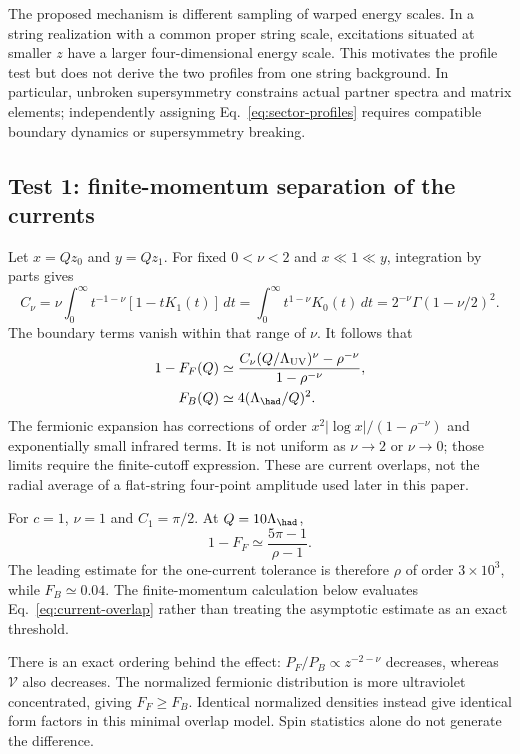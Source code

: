 The proposed mechanism is different sampling of warped energy scales. In a string realization with a common proper string scale, excitations situated at smaller $z$ have a larger four-dimensional energy scale. This motivates the profile test but does not derive the two profiles from one string background. In particular, unbroken supersymmetry constrains actual partner spectra and matrix elements; independently assigning Eq.~\eqref{eq:sector-profiles} requires compatible boundary dynamics or supersymmetry breaking.

\subsection{Test 1: finite-momentum separation of the currents}
Let $x=Qz_0$ and $y=Qz_1$. For fixed $0<\nu<2$ and $x\ll1\ll y$, integration by parts gives
\begin{equation}
 C_\nu=\nu\int_0^\infty t^{-1-\nu}[1-tK_1(t)]\,dt
 =\int_0^\infty t^{1-\nu}K_0(t)\,dt
 =2^{-\nu}\Gamma(1-\nu/2)^2.
\end{equation}
The boundary terms vanish within that range of $\nu$. It follows that
\begin{align}
 1-F_F(Q)&\simeq
 \frac{C_\nu(Q/\Lambda_{\rm UV})^\nu-\rho^{-\nu}}
 {1-\rho^{-\nu}},
 \label{eq:localized-current}\\
 F_B(Q)&\simeq4(\Lambda_{\had}/Q)^2.
\end{align}
The fermionic expansion has corrections of order
$x^2|\log x|/(1-\rho^{-\nu})$ and exponentially small infrared terms. It is not uniform as $\nu\to2$ or $\nu\to0$; those limits require the finite-cutoff expression. These are current overlaps, not the radial average of a flat-string four-point amplitude used later in this paper.

For $c=1$, $\nu=1$ and $C_1=\pi/2$. At $Q=10\Lambda_{\had}$,
\begin{equation}
 1-F_F\simeq\frac{5\pi-1}{\rho-1}.
\end{equation}
The leading estimate for the one-current tolerance is therefore $\rho$ of order $3\times10^3$, while $F_B\simeq0.04$. The finite-momentum calculation below evaluates Eq.~\eqref{eq:current-overlap} rather than treating the asymptotic estimate as an exact threshold.



There is an exact ordering behind the effect: $P_F/P_B\propto z^{-2-\nu}$ decreases, whereas $\mathcal V$ also decreases. The normalized fermionic distribution is more ultraviolet concentrated, giving $F_F\geq F_B$. Identical normalized densities instead give identical form factors in this minimal overlap model. Spin statistics alone do not generate the difference.


